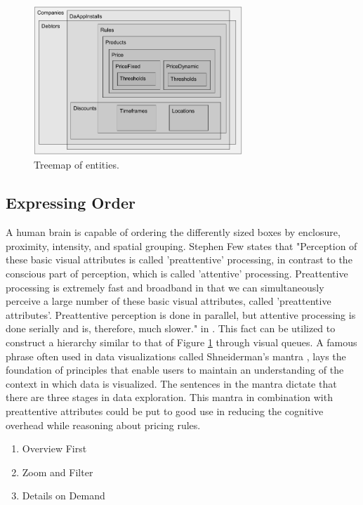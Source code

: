 \begin{figure}[H]
	\centering
	\includegraphics[width=0.7\textwidth]{Treemap}
	\caption[Treemap of Components]{Treemap of entities.}
	\label{fig:Treemap}
\end{figure}

\subsection{Expressing Order}
A human brain is capable of ordering the differently sized boxes by enclosure, proximity, intensity, and spatial grouping. Stephen Few states that "Perception of these basic visual attributes is called 'preattentive' processing, in contrast to the conscious part of perception, which is called 'attentive' processing. Preattentive processing is extremely fast and broadband in that we can simultaneously perceive a large number of these basic visual attributes, called 'preattentive attributes'. Preattentive perception is done in parallel, but attentive processing is done serially and is, therefore, much slower." in \cite[p.~3]{few}. This fact can be utilized to construct a hierarchy similar to that of Figure \ref{fig:Treemap} through visual queues. A famous phrase often used in data visualizations called Shneiderman's mantra \cite{mantra}, lays the foundation of principles that enable users to maintain an understanding of the context in which data is visualized. The sentences in the mantra dictate that there are three stages in data exploration. This mantra in combination with preattentive attributes could be put to good use in reducing the cognitive overhead while reasoning about pricing rules.

\begin{enumerate}
	\item Overview First
	\item Zoom and Filter
	\item Details on Demand
\end{enumerate}

